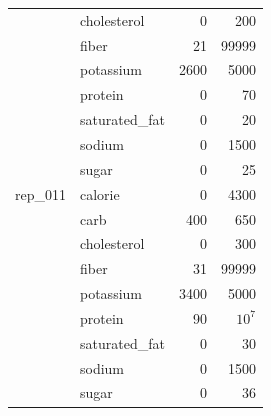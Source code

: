 \begin{tabular}{@{}clrr@{}}
 & cholesterol & 0 & 200 \\
 & fiber & 21 & 99999 \\
 & potassium & 2600 & 5000 \\
 & protein & 0 & 70 \\
 & saturated\_fat & 0 & 20 \\
 & sodium & 0 & 1500 \\
 & sugar & 0 & 25 \\
\midrule
rep\_011 & calorie & 0 & 4300 \\
 & carb & 400 & 650 \\
 & cholesterol & 0 & 300 \\
 & fiber & 31 & 99999 \\
 & potassium & 3400 & 5000 \\
 & protein & 90 & $10^{7}$ \\
 & saturated\_fat & 0 & 30 \\
 & sodium & 0 & 1500 \\
 & sugar & 0 & 36 \\
\bottomrule
\end{tabular}

